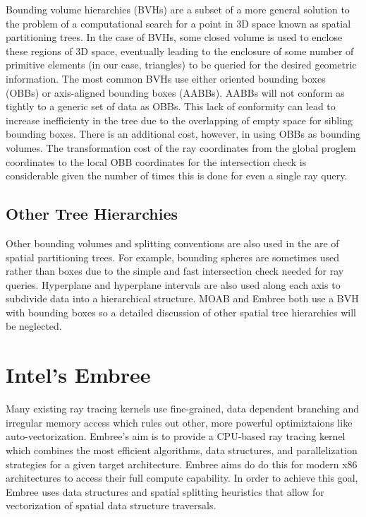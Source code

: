 \documentclass{anstrans}
\begin{document}
Bounding volume hierarchies (BVHs) are a subset of a more general solution to the problem of a computational search for a point in 3D space known as spatial partitioning trees. In the case of BVHs, some closed volume is used to enclose these regions of 3D space, eventually leading to the enclosure of some number of primitive elements (in our case, triangles) to be queried for the desired geometric information. The most common BVHs use either oriented bounding boxes (OBBs) or axis-aligned bounding boxes (AABBs). AABBs will not conform as tightly to a generic set of data as OBBs. This lack of conformity can lead to increase inefficienty in the tree due to the overlapping of empty space for sibling bounding boxes. There is an additional cost, however, in using OBBs as bounding volumes. The transformation cost of the ray coordinates from the global proglem coordinates to the local OBB coordinates for the intersection check is considerable given the number of times this is done for even a single ray query. 

\subsection{Other Tree Hierarchies} 

Other bounding volumes and splitting conventions are also used in the are of spatial partitioning trees. For example, bounding spheres are sometimes used rather than boxes due to the simple and fast intersection check needed for ray queries. Hyperplane and hyperplane intervals are also used along each axis to subdivide data into a hierarchical structure. MOAB and Embree both use a BVH with bounding boxes so a detailed discussion of other spatial tree hierarchies will be neglected.


\section{Intel's Embree}

Many existing ray tracing kernels use fine-grained, data dependent branching and irregular memory access which rules out other, more powerful optimiztaions like auto-vectorization. Embree's aim is to provide a CPU-based ray tracing kernel which combines the most efficient algorithms, data structures, and parallelization strategies for a given target architecture. Embree aims do do this for modern x86 architectures to access their full compute capability. In order to achieve this goal, Embree uses data structures and spatial splitting heuristics that allow for vectorization of spatial data structure traversals. \cite{embree} 
\end{document}
